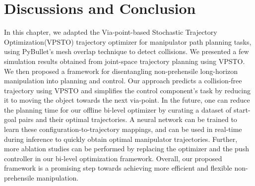 \section{Discussions and Conclusion}

In this chapter, we adapted the Via-point-based Stochastic Trajectory Optimization(VPSTO) trajectory optimizer for manipulator path planning tasks, using PyBullet's mesh overlap technique to detect collisions. We presented a few simulation results obtained from joint-space trajectory planning using VPSTO. We then proposed a framework for disentangling non-prehensile long-horizon manipulation into planning and control. Our approach predicts a collision-free trajectory using VPSTO and simplifies the control component's task by reducing it to moving the object towards the next via-point. In the future, one can reduce the planning time for our offline bi-level optimizer by curating a dataset of start-goal pairs and their optimal trajectories. A neural network can be trained to learn these configuration-to-trajectory mappings, and can be used in real-time during inference to quickly obtain optimal manipulator trajectories. Further, more ablation studies can be performed by replacing the optimizer and the push controller in our bi-level optimization framework. Overall, our proposed framework is a promising step towards achieving more efficient and flexible non-prehensile manipulation.